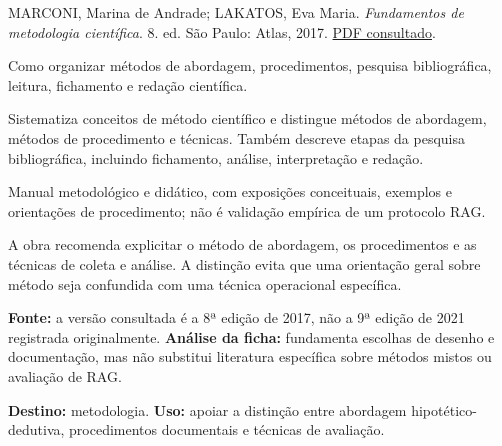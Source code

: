 {\small MARCONI, Marina de Andrade; LAKATOS, Eva Maria. \textit{Fundamentos de metodologia científica}. 8. ed. São Paulo: Atlas, 2017. \href{https://ia600709.us.archive.org/26/items/Fundamentos_de_metodologia_cientfica_8._ed._-_www.meulivro.biz/Fundamentos_de_metodologia_cientfica_8._ed._-_www.meulivro.biz.pdf}{PDF consultado}.\par}

Como organizar métodos de abordagem, procedimentos, pesquisa bibliográfica, leitura, fichamento e redação científica.

Sistematiza conceitos de método científico e distingue métodos de abordagem, métodos de procedimento e técnicas. Também descreve etapas da pesquisa bibliográfica, incluindo fichamento, análise, interpretação e redação.

Manual metodológico e didático, com exposições conceituais, exemplos e orientações de procedimento; não é validação empírica de um protocolo RAG.

A obra recomenda explicitar o método de abordagem, os procedimentos e as técnicas de coleta e análise. A distinção evita que uma orientação geral sobre método seja confundida com uma técnica operacional específica.

\begin{itemize}
\end{itemize}

\textbf{Fonte:} a versão consultada é a 8ª edição de 2017, não a 9ª edição de 2021 registrada originalmente. \textbf{Análise da ficha:} fundamenta escolhas de desenho e documentação, mas não substitui literatura específica sobre métodos mistos ou avaliação de RAG.

\textbf{Destino:} metodologia. \textbf{Uso:} apoiar a distinção entre abordagem hipotético-dedutiva, procedimentos documentais e técnicas de avaliação.

